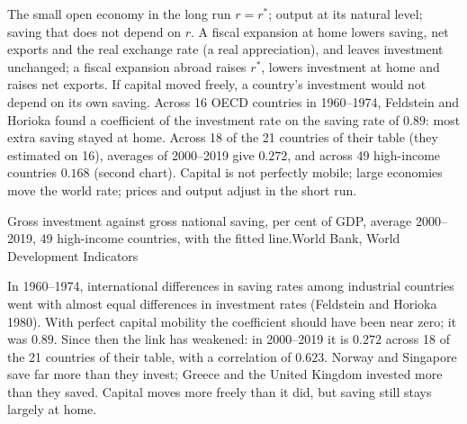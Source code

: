 \begin{model}{The small open economy in the long run}
\assumes $r = r^*$; output at its natural level; saving that does not
depend on $r$.
\predicts A fiscal expansion at home lowers saving, net exports and the
real exchange rate (a real appreciation), and leaves investment
unchanged; a fiscal expansion abroad raises $r^*$, lowers investment at home
and raises net exports.
\tested If capital moved freely, a country's investment would not depend
on its own saving. Across 16 OECD countries in 1960--1974, Feldstein and
Horioka found a coefficient of the investment rate on the saving rate of
$0.89$: most extra saving stayed at home. %
Across 18 of the 21 countries of their table (they estimated on 16),
averages of 2000--2019 give $0.272$, and
across 49 high-income countries $0.168$ (second chart). %
\breaks Capital is not perfectly mobile; large economies move the world
rate; prices and output adjust in the short run.
\end{model}

\begin{omchart}{Gross investment against gross national saving, per cent of
GDP, average 2000--2019, 49 high-income countries, with the fitted
line.}{World Bank, World Development Indicators}
\end{omchart}

\begin{record}
In 1960--1974, international differences in saving rates among industrial
countries went with almost equal differences in investment rates
(Feldstein and Horioka 1980). %
With perfect capital mobility the coefficient should have been near zero;
it was $0.89$. Since then the link has weakened: in 2000--2019 it is $0.272$
across 18 of the 21 countries of their table, with a correlation of $0.623$. %
Norway and Singapore save far more than they invest; Greece and the United
Kingdom invested more than they saved. Capital moves more freely than it
did, but saving still stays largely at home.
\end{record}

